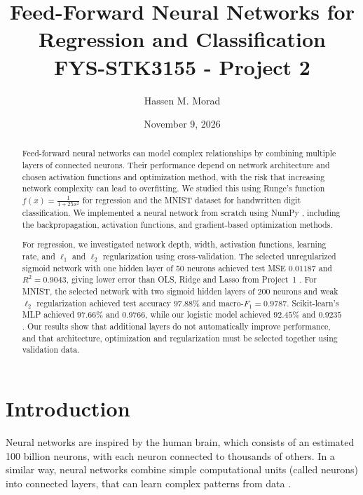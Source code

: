 \documentclass[amssymb,secnumarabic,twocolumn,aps]{revtex4}
\begin{document}
\title{Feed-Forward Neural Networks for Regression and Classification\\
    \normalsize FYS-STK3155 - Project 2}
\date{November 9, 2026}
\author{Hassen M. Morad}

\newpage

\begin{abstract}
    Feed-forward neural networks can model complex relationships by combining multiple layers of connected neurons. Their performance depend on network architecture and chosen activation functions and optimization method, with the risk that increasing network complexity can lead to overfitting. We studied this using Runge's function $f(x) = \frac{1}{1+25x^2}$ for regression and the MNIST dataset \cite{lecun2010mnist} for handwritten digit classification. We implemented a neural network from scratch using NumPy \cite{numpy}, including the backpropagation, activation functions, and gradient-based optimization methods.

    For regression, we investigated network depth, width, activation functions, learning rate, and $\ell_1$ and $\ell_2$ regularization using cross-validation. The selected unregularized sigmoid network with one hidden layer of 50 neurons achieved test MSE $0.01187$ and $R^2=0.9043$, giving lower error than OLS, Ridge and Lasso from Project~1 \cite{project1}. For MNIST, the selected network with two sigmoid hidden layers of 200 neurons and weak $\ell_2$ regularization achieved test accuracy $97.88\%$ and macro-$F_1=0.9787$. Scikit-learn's MLP achieved $97.66\%$ and $0.9766$, while our logistic model achieved $92.45\%$ and $0.9235$. Our results show that additional layers do not automatically improve performance, and that architecture, optimization and regularization must be selected together using validation data.
\end{abstract}

\maketitle

\section{Introduction}

Neural networks are inspired by the human brain, which consists of an estimated 100 billion neurons, with each neuron connected to thousands of others. In a similar way, neural networks combine simple computational units (called neurons) into connected layers, that can learn complex patterns from data \cite{ibm_neural_networks}.
\end{document}
